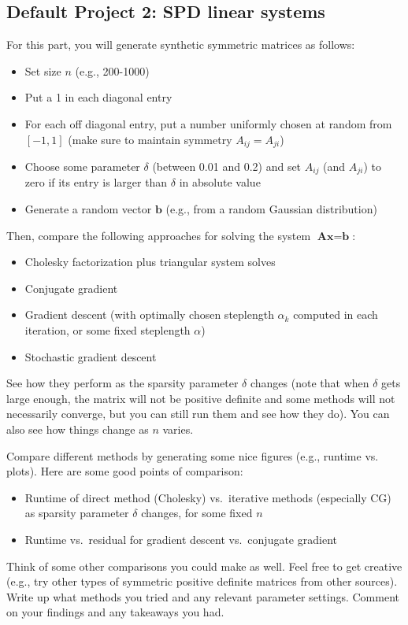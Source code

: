 \documentclass{article}
\newcommand{\mA}{\textbf{A}}
\newcommand{\vb}{\textbf{b}}
\begin{document}
\subsection{Default Project 2: SPD linear systems}
For this part, you will generate synthetic symmetric matrices as follows:
\begin{itemize}
	\item Set size $n$ (e.g., 200-1000)
	\item Put a 1 in each diagonal entry
	\item For each off diagonal entry, put a number uniformly chosen at random from $[-1,1]$ (make sure to maintain symmetry $A_{ij} = A_{ji}$)
	\item Choose some parameter $\delta$ (between 0.01 and 0.2) and set $A_{ij}$ (and $A_{ji}$) to zero if its entry is larger than $\delta$ in absolute value
	\item Generate a random vector  $\vb$ (e.g., from a random Gaussian distribution) 
\end{itemize}
Then, compare the following approaches for solving the system $\mA \textbf{x} = \vb$:
\begin{itemize}
	\item Cholesky factorization plus triangular system solves
	\item Conjugate gradient
	\item Gradient descent (with optimally chosen steplength $\alpha_k$ computed in each iteration, or some fixed steplength $\alpha$)
	\item Stochastic gradient descent
\end{itemize}
See how they perform as the sparsity parameter $\delta$ changes (note that when $\delta$ gets large enough, the matrix will not be positive definite and some methods will not necessarily converge, but you can still run them and see how they do). You can also see how things change as $n$ varies. 

Compare different methods by generating some nice figures (e.g., runtime vs. plots). Here are some good points of comparison:
\begin{itemize}
	\item Runtime of direct method (Cholesky) vs.\ iterative methods (especially CG) as sparsity parameter $\delta$ changes, for some fixed $n$
	\item Runtime vs.\ residual for gradient descent vs.\ conjugate gradient
\end{itemize} 
Think of some other comparisons you could make as well. Feel free to get creative (e.g., try other types of symmetric positive definite matrices from other sources). Write up what methods you tried and any relevant parameter settings. Comment on your findings and any takeaways you had. 
\end{document}
